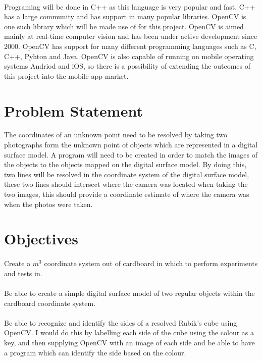 \documentclass{article}
\begin{document}
\paragraph{}
Programing will be done in C++ as this language is very popular and fast. C++ has a large community and has support in many popular libraries. OpenCV is one such library which will be made use of for this project. OpenCV is aimed mainly at real-time computer vision and has been under active development since 2000. OpenCV has support for many different programming languages such as C, C++, Pyhton and Java. OpenCV is also capable of running on mobile operating systems Andriod and iOS, so there is a possibility of extending the outcomes of this project into the mobile app market.

\newpage

\section{Problem Statement}
The coordinates of an unknown point need to be resolved by taking two photographs form the unknown point of objects which are represented in a digital surface model. A program will need to be created in order to match the images of the objects to the objects mapped on the digital surface model. By doing this, two lines will be resolved in the coordinate system of the digital surface model, these two lines should intersect where the camera was located when taking the two images, this should provide a coordinate estimate of where the camera was when the photos were taken.

\newpage

\section{Objectives}

\paragraph{}
Create a $m^3$ coordinate system out of cardboard in which to perform experiments and tests in.

\paragraph{}
Be able to create a simple digital surface model of two regular objects within the cardboard coordinate system.

\paragraph{}
Be able to recognize and identify the sides of a resolved Rubik's cube using OpenCV. I would do this by labelling each side of the cube using the colour as a key, and then supplying OpenCV with an image of each side and be able to have a program which can identify the side based on the colour.
\end{document}
